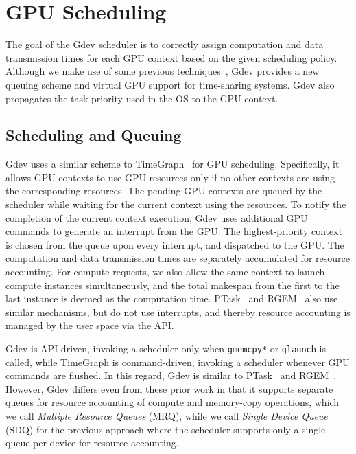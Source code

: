 \vspace{-0.25em}
\section{GPU Scheduling}
\label{sec:scheduling}
\vspace{-0.25em}

The goal of the Gdev scheduler is to correctly assign computation and
data transmission times for each GPU context based on the given
scheduling policy.
Although we make use of some previous
techniques~\cite{Kato_RTSS11,Kato_ATC11}, Gdev provides a new queuing
scheme and virtual GPU support for time-sharing systems.
Gdev also propagates the task priority used in the OS to the GPU context.

\vspace{-0.25em}
\subsection{Scheduling and Queuing}
\label{sec:scheduling_queueing}
\vspace{-0.25em}

Gdev uses a similar scheme to TimeGraph~\cite{Kato_ATC11} for GPU
scheduling.
Specifically, it allows GPU contexts to use GPU resources only if no
other contexts are using the corresponding resources.
The pending GPU contexts are queued by the scheduler while waiting for
the current context using the resources.
To notify the completion of the current context execution, Gdev
uses additional GPU commands to generate an interrupt from the GPU.
The highest-priority context is chosen from the queue upon every
interrupt, and dispatched to the GPU.
The computation and data transmission times are separately accumulated
for resource accounting.
For compute requests, we also allow the same context to launch compute
instances simultaneously, and the total makespan from the first to the last
instance is deemed as the computation time.
PTask~\cite{Rossbach_SOSP11} and RGEM~\cite{Kato_RTSS11} also use
similar mechanisms, but do not use interrupts, and thereby resource
accounting is managed by the user space via the API.

Gdev is API-driven, invoking a scheduler only when \texttt{gmemcpy*} or
\texttt{glaunch} is called, while TimeGraph is command-driven, invoking
a scheduler whenever GPU commands are flushed.
In this regard, Gdev is similar to PTask~\cite{Rossbach_SOSP11} and
RGEM~\cite{Kato_RTSS11}.
However, Gdev differs even from these prior work in that it supports
separate queues for resource accounting of compute and memory-copy
operations, which we call \textit{Multiple Resource Queues} (MRQ), while
we call \textit{Single Device Queue} (SDQ) for the previous approach
where the scheduler supports only a single queue per device for resource
accounting.

